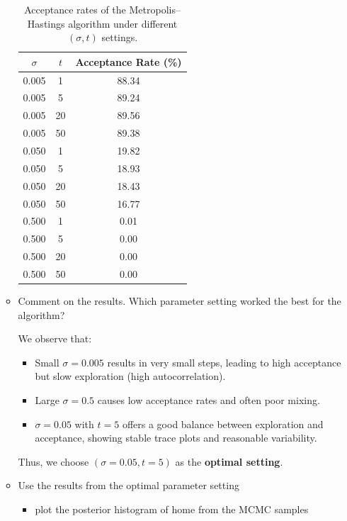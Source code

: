 \documentclass{article}
\begin{document}
\begin{enumerate}
\begin{itemize}
\begin{table}[H]
\centering
\begin{tabular}{ccc}
\toprule
$\sigma$ & $t$ & Acceptance Rate (\%) \\
\midrule
0.005 & 1  & 88.34 \\
0.005 & 5  & 89.24 \\
0.005 & 20 & 89.56 \\
0.005 & 50 & 89.38 \\
0.050 & 1  & 19.82 \\
0.050 & 5  & 18.93 \\
0.050 & 20 & 18.43 \\
0.050 & 50 & 16.77 \\
0.500 & 1  & 0.01  \\
0.500 & 5  & 0.00  \\
0.500 & 20 & 0.00  \\
0.500 & 50 & 0.00  \\
\bottomrule
\end{tabular}
\caption{Acceptance rates of the Metropolis--Hastings algorithm under different $(\sigma, t)$ settings.}
\label{tab:acceptance-rates}
\end{table}


\item Comment on the results. Which parameter setting worked the best for the algorithm?

We observe that:
\begin{itemize}
    \item Small $\sigma = 0.005$ results in very small steps, leading to high acceptance but slow exploration (high autocorrelation).
    \item Large $\sigma = 0.5$ causes low acceptance rates and often poor mixing.
    \item $\sigma = 0.05$ with $t = 5$ offers a good balance between exploration and acceptance, showing stable trace plots and reasonable variability.
\end{itemize}

Thus, we choose $(\sigma=0.05, t=5)$ as the \textbf{optimal setting}.


\item Use the results from the optimal parameter setting
\begin{itemize}
\item plot the posterior histogram of home from the MCMC samples


\end{itemize}
\end{itemize}
\end{enumerate}
\end{document}
